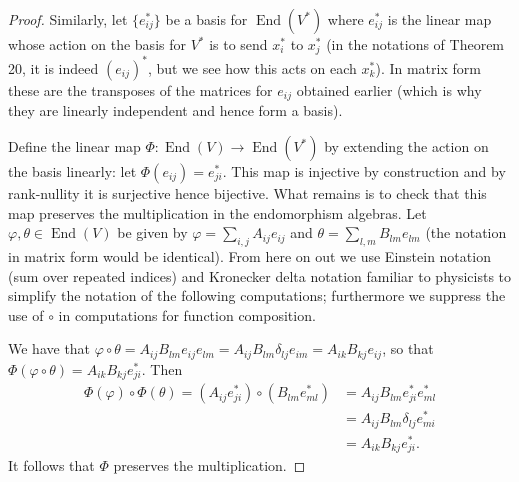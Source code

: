 \documentclass[11pt]{article}
\newcommand{\br}[1]{\left(#1\right)}
\DeclareMathOperator{\End}{End}
\begin{document}
\begin{enumerate}
\begin{proof}
        Similarly, let $\{e_{ij}^\ast\}$ be a basis for $\End(V^\ast)$ where $e_{ij}^\ast$ is the linear map whose action on the basis for $V^\ast$ is to send $x_i^\ast$ to $x_j^\ast$ (in the notations of Theorem 20, it is indeed $(e_{ij})^\ast$, but we see how this acts on each $x_k^\ast$). In matrix form these are the transposes of the matrices for $e_{ij}$ obtained earlier (which is why they are linearly independent and hence form a basis).

        Define the linear map $\Phi\colon \End(V)\to\End(V^\ast)$ by extending the action on the basis linearly: let $\Phi(e_{ij}) = e_{ji}^\ast$. This map is injective by construction and by rank-nullity it is surjective hence bijective. What remains is to check that this map preserves the multiplication in the endomorphism algebras. Let $\varphi,\theta\in \End(V)$ be given by $\varphi = \sum_{i,j}A_{ij}e_{ij}$ and $\theta = \sum_{l,m} B_{lm}e_{lm}$ (the notation in matrix form would be identical). From here on out we use Einstein notation (sum over repeated indices) and Kronecker delta notation familiar to physicists to simplify the notation of the following computations; furthermore we suppress the use of $\circ$ in computations for function composition.
        
        We have that $\varphi\circ\theta = A_{ij}B_{lm}e_{ij}e_{lm} = A_{ij}B_{lm}\delta_{lj}e_{im} = A_{ik}B_{kj}e_{ij}$, so that $\Phi(\varphi\circ\theta) = A_{ik}B_{kj}e_{ji}^\ast$. Then \begin{align*}
            \Phi(\varphi)\circ \Phi(\theta) = \br{A_{ij}e_{ji}^\ast} \circ \br{B_{lm}e_{ml}^\ast} &= A_{ij}B_{lm}e_{ji}^\ast e_{ml}^\ast\\
            &= A_{ij}B_{lm}\delta_{lj}e_{mi}^\ast\\
            &= A_{ik}B_{kj}e_{ji}^\ast.
        \end{align*} It follows that $\Phi$ preserves the multiplication.


\end{proof}
\end{enumerate}
\end{document}
